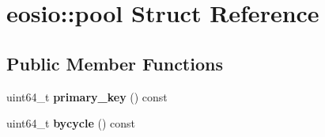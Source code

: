 \hypertarget{structeosio_1_1pool}{}\section{eosio\+:\+:pool Struct Reference}
\label{structeosio_1_1pool}
\subsection*{Public Member Functions}
\begin{DoxyCompactItemize}
\item 
\mbox{\label{structeosio_1_1pool_aaaabdd425fc78c62e562f59fb8fa4960}} 
uint64\+\_\+t {\bfseries primary\+\_\+key} () const
\item 
\mbox{\label{structeosio_1_1pool_a02a6ee23d56eaf744be34c24e12382a0}} 
uint64\+\_\+t {\bfseries bycycle} () const
\end{DoxyCompactItemize}
